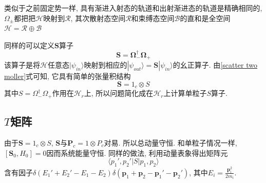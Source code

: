 \documentclass[a4paper,11pt]{book}
\newcommand{\pp}{\mathbf{p}}
\begin{document}
类似于之前固定势一样, 具有渐进入射态的轨道和出射渐进态的轨道是精确相同的, $\Omega_\pm$都把把$\mathcal{H}$映射到$\mathcal{R}$, 其次散射态空间$\mathcal{R}$和束缚态空间$\mathcal{B}$的直和是全空间$\mathcal{H}=\mathcal{R}\oplus\mathcal{B}$

同样的可以定义$\mathbf{S}$算子
\begin{equation*}
  \mathbf{S}=\mathbf{\Omega}_-^\dag\mathbf{\Omega}_+
\end{equation*}
该算子是将$\mathcal{H}$任意态$|\psi_{in}\rangle$映射到相应的$|\psi_{out}\rangle=\mathbf{S}|\psi_{in}\rangle$的幺正算子. 由\eqref{scatter two moller}式可知, 它具有简单的张量积结构
\begin{equation*}
  \mathbf{S}=1_c\otimes S
\end{equation*}
其中$S=\Omega_-^\dag\Omega_+$作用在$\mathcal{H}_r$上, 所以问题简化成在$\mathcal{H}_r$上计算单粒子$S$算子.
\subsection{$T$矩阵}
由于$\mathbf{S}=1_c\otimes S$, $\mathbf{S}$与$\mathbf{P}_c=1\otimes P_c$对易. 所以总动量守恒. 和单粒子情况一样, $[\mathbf{S}_0,H_0]=0$因而系统能量守恒. 同样的做法, 利用动量表象得出矩阵元
\begin{equation*}
  \langle p_1',p_2'|S|p_1,p_2\rangle
\end{equation*}
含有因子$\delta(E_1'+E_2'-E_1-E_2)\delta(\pp_1+\pp_2-\pp_1'-\pp_2')$, 其中$E_i=\frac{\pp_i^2}{2m_i}$.
\end{document}
